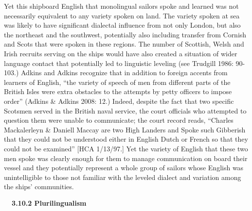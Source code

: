 \begin{styleStandard}
Yet this shipboard English that monolingual sailors spoke and learned was not necessarily equivalent to any variety spoken on land. The variety spoken at sea was likely to have significant dialectal influence from not only London, but also the northeast and the southwest, potentially also including transfer from Cornish and Scots that were spoken in these regions. The number of Scottish, Welsh and Irish recruits serving on the ships would have also created a situation of wider language contact that potentially led to linguistic leveling (see Trudgill 1986: 90-103.) Adkins and Adkins recognize that in addition to foreign accents from learners of English, “the variety of speech of men from different parts of the British Isles were extra obstacles to the attempts by petty officers to impose order” (Adkins \& Adkins 2008: 12.) Indeed, despite the fact that two specific Scotsmen served in the British naval service, the court officials who attempted to question them were unable to communicate; the court record reads, “Charles Mackalerleyn \& Daniell Maccay are two High Landers and Spoke such Gibberish that they could not be understood either in English Dutch or French so that they could not be examined” [HCA 1/13/97.] Yet the variety of English that these two men spoke was clearly enough for them to manage communication on board their vessel and they potentially represent a whole group of sailors whose English was unintelligible to those not familiar with the leveled dialect and variation among the ships’ communities. 
\end{styleStandard}


\begin{styleStandard}
\textbf{\ \ 3.10.2 Plurilingualism}
\end{styleStandard}


